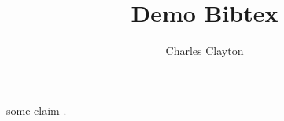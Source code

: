 \documentclass{article}
\title{Demo Bibtex}
\author{Charles Clayton}
\begin{document}
\maketitle

some claim \cite{dirac}.





\end{document}
